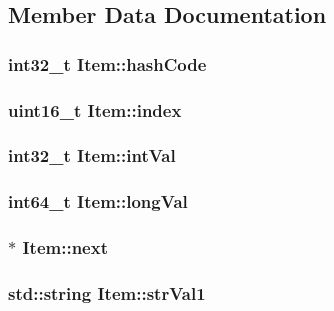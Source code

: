 \subsection{Member Data Documentation}
\hypertarget{classItem_a1fad09954d2cc9ec2233d3328aead6c2}{
\subsubsection[{hash\-Code}]{\setlength{\rightskip}{0pt plus 5cm}int32\-\_\-t Item\-::hash\-Code}}\label{classItem_a1fad09954d2cc9ec2233d3328aead6c2}
\hypertarget{classItem_aee551f9d28c1aef4bd3b15e9dfe5f6fd}{
\subsubsection[{index}]{\setlength{\rightskip}{0pt plus 5cm}uint16\-\_\-t Item\-::index}}\label{classItem_aee551f9d28c1aef4bd3b15e9dfe5f6fd}
\hypertarget{classItem_a37e64449e06749eded7f699b13f8ede7}{
\subsubsection[{int\-Val}]{\setlength{\rightskip}{0pt plus 5cm}int32\-\_\-t Item\-::int\-Val}}\label{classItem_a37e64449e06749eded7f699b13f8ede7}
\hypertarget{classItem_aaaa7f2c4f4a2163862b1508202ecf038}{
\subsubsection[{long\-Val}]{\setlength{\rightskip}{0pt plus 5cm}int64\-\_\-t Item\-::long\-Val}}\label{classItem_aaaa7f2c4f4a2163862b1508202ecf038}
\hypertarget{classItem_af41ed24b86b2126cf7eacc591a863f47}{
\subsubsection[{next}]{$\ast$ Item\-::next}}\label{classItem_af41ed24b86b2126cf7eacc591a863f47}
\hypertarget{classItem_a0769fc287f38f56be204b2deb9fc9326}{
\subsubsection[{str\-Val1}]{\setlength{\rightskip}{0pt plus 5cm}std\-::string Item\-::str\-Val1}}\label{classItem_a0769fc287f38f56be204b2deb9fc9326}
